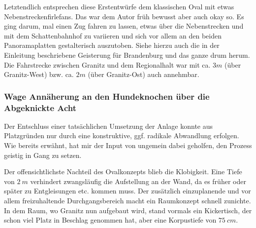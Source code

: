 Letztendlich entsprechen diese Erstentw\"urfe dem klassischen Oval mit etwas Nebenstreckenfirlefans.
Das war dem Autor fr\"uh bewusst aber auch okay so.
Es ging darum, mal einen Zug fahren zu lassen, etwas \"uber die Nebenstrecken und mit dem Schattenbahnhof zu variieren und sich vor allem an den beiden Panoramaplatten gestalterisch auszutoben.
Siehe hierzu auch die in der Einleitung beschriebene Geisterung f\"ur Brandenburg und das ganze drum herum.
Die Fahrstrecke zwischen Granitz und dem Regionalhalt war mit ca. $3m$ (\"uber Granitz-West) bzw. ca. $2m$ (\"uber Granitz-Ost) auch annehmbar.


\subsubsection{Wage Ann\"aherung an den Hundeknochen \"uber die Abgeknickte Acht}

Der Entschluss einer tats\"achlichen Umsetzung der Anlage konnte aus Platzgr\"unden nur durch eine konstruktive, ggf. radikale Abwandlung erfolgen.
Wie bereits erw\"ahnt, hat mir der Input von \cite{Gee17} ungemein dabei geholfen, den Prozess geistig in Gang zu setzen.

Der offensichtlichste Nachteil des Ovalkonzepts blieb die Klobigkeit.
Eine Tiefe von $2~m$ verhindert zwangsl\"aufig die Aufstellung an der Wand, da es fr\"uher oder sp\"ater zu Entgleisungen etc. kommen muss.
Der zus\"atzlich einzuplanende und vor allem freizuhaltende Durchgangsbereich macht ein Raumkonzept schnell zunichte.
In dem Raum, wo Granitz nun aufgebaut wird, stand vormals ein Kickertisch, der schon viel Platz in Beschlag genommen hat, aber eine Korpustiefe von $75~cm$.

